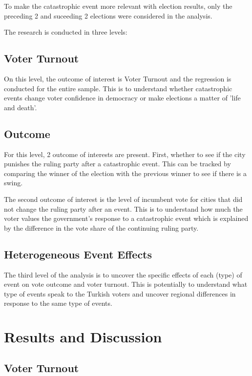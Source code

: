 \documentclass[12pt]{article}
\begin{document}
To make the catastrophic event more relevant with election results, only the preceding 2 and suceeding 2 elections were considered in the analysis.

The research is conducted in three levels:

\subsection{Voter Turnout}

On this level, the outcome of interest is Voter Turnout and the regression is conducted for the entire sample. This is to understand whether catastrophic events change voter confidence in democracy or make elections a matter of 'life and death'.

\subsection{Outcome}

For this level, 2 outcome of interests are present. First, whether to see if the city punishes the ruling party after a catastrophic event. This can be tracked by comparing the winner of the election with the previous winner to see if there is a swing.

The second outcome of interest is the level of incumbent vote for cities that did not change the ruling party after an event. This is to understand how much the voter values the government's response to a catastrophic event which is explained by the difference in the vote share of the continuing ruling party.

\subsection{Heterogeneous Event Effects}

The third level of the analysis is to uncover the specific effects of each (type) of event on vote outcome and voter turnout. This is potentially to understand what type of events speak to the Turkish voters and uncover regional differences in response to the same type of events.

\section{Results and Discussion}

\subsection{Voter Turnout}
\end{document}

